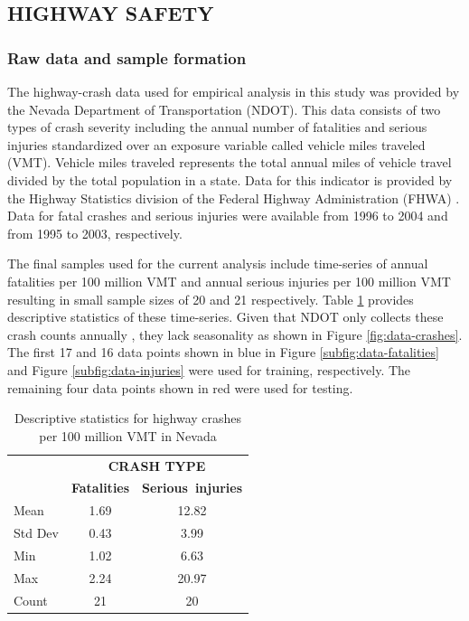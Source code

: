 \documentclass[letterpaper]{article}
\begin{document}
\subsection{HIGHWAY SAFETY}

\subsubsection{Raw data and sample formation}

The highway-crash data used for empirical analysis in this study was provided by the Nevada Department of Transportation (NDOT). This data consists of two types of crash severity including the annual number of fatalities and serious injuries standardized over an exposure variable called vehicle miles traveled (VMT). Vehicle miles traveled represents the total annual miles of vehicle travel divided by the total population in a state. Data for this indicator is provided by the Highway Statistics division of the Federal Highway Administration (FHWA) \citep{FHWA}. Data for fatal crashes and serious injuries were available from 1996 to 2004 and from 1995 to 2003, respectively. 

The final samples used for the current analysis include time-series of annual fatalities per 100 million VMT and annual serious injuries per 100 million VMT resulting in small sample sizes of 20 and 21 respectively. Table \ref{tab:descriptive-stats-fatalities} provides descriptive statistics of these time-series. Given that NDOT only collects these crash counts annually \citep{veeramisti2016business}, they lack seasonality as shown in Figure \ref{fig:data-crashes}. The first 17 and 16 data points shown in blue in Figure \ref{subfig:data-fatalities} and Figure \ref{subfig:data-injuries} were used for training, respectively. The remaining four data points shown in red were used for testing. 

\begin{table}[h]
\caption{Descriptive statistics for highway crashes per 100 million VMT in Nevada}
\label{tab:descriptive-stats-fatalities}
\begin{center}
\begin{tabular}{l@{\qquad}cc}
  \toprule
  \multirow{2}{*}{\raisebox{-\heavyrulewidth}{\bf STATISTIC}} & \multicolumn{2}{c}{\bf CRASH TYPE} \\
  \cmidrule{2-3}
  & {\bf Fatalities} & {\bf Serious~injuries} \\
  \midrule
  Mean & 1.69 & 12.82  \\
  Std Dev & 0.43 & 3.99  \\
  Min & 1.02 & 6.63  \\
  Max & 2.24 & 20.97  \\
  Count & 21 & 20  \\
  \bottomrule
\end{tabular}
\end{center}
\end{table}
\end{document}
